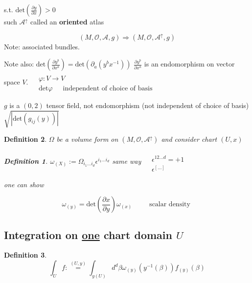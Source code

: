 \documentclass[10pt, twoside]{amsart}
\newtheorem{definition}{Definition}
\begin{document}
\begin{multicols*}{2}
s.t. $\text{det}\left( \frac{ \partial y}{ \partial x} \right) >0$  \\
\phantom{ \quad \, } such $\mathcal{A}^{\uparrow} $ called an \textbf{oriented} atlas 

\[
(M, \mathcal{O}, \mathcal{A},g) \Longrightarrow (M,\mathcal{O},\mathcal{A}^{\uparrow} ,g)
\]
Note: associated bundles.

Note also:
$ \text{det}\left( \frac{ \partial y^b}{ \partial x^a} \right) = \text{det}(\partial_a(y^bx^{-1}))$ \phantom{ \quad \quad \, } $\frac{ \partial y^b}{ \partial x^a}$ is an endomorphism on vector space $V$.  $\begin{aligned} & \quad \\ 
& \varphi : V \to V \\
& \text{det}\varphi \quad \, \text{ independent of choice of basis } \end{aligned}$

\phantom{\quad \quad \, } $g$ is a $(0,2)$ tensor field, not endomorphism (not independent of choice of basis) $\sqrt{ |\text{det}(g_{ij}(y)) | }$

\begin{definition} $\Omega$ be a volume form on $(M,\mathcal{O}, \mathcal{A}^{\uparrow} )$ and consider chart $(U,x)$ 
\begin{definition} $\omega_{(X)} := \Omega_{i_1\dots i_d} \epsilon^{i_1\dots i_d}$
same way $\begin{aligned} & \quad \\ 
& \epsilon^{12 \dots d} = +1 \\ 
& \epsilon^{[\dots ]} \end{aligned}$

one can show

\[
\boxed{ \omega_{(y)} = \text{det}\left( \frac{ \partial x}{ \partial y} \right) \omega_{(x)} } \quad \quad \, \text{ scalar density }
\]
\end{definition}
\end{definition}

\subsection{Integration on \underline{one} chart domain $U$}

\begin{definition}
\begin{equation}
\boxed{ \int_U f :\overset{ (U,y) }{=} \int_{y(U)} d^d\beta \omega_{(y)}(y^{-1}(\beta)) f_{(y)}(\beta) }
\end{equation}
\end{definition}


\end{multicols*}
\end{document}
